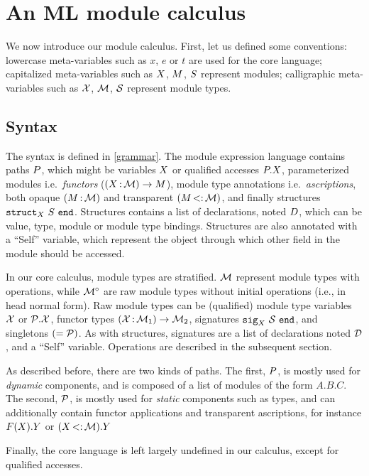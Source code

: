 \section{An ML module calculus}

We now introduce our module calculus.
First, let us defined some conventions:
lowercase meta-variables such as $x$, $e$ or $t$ are used for the core language;
capitalized meta-variables such as $X$, $M$, $S$ represent modules;
calligraphic meta-variables such as $\mathcal X$, $\mathcal M$, $\mathcal S$ represent module types.

\subsection{Syntax}

The syntax is defined in \cref{grammar}.
The module expression language contains paths $P$, which might
be variables $X$ or qualified accesses $P.X$,
parameterized modules i.e.~\emph{functors} ($(X \operatorname{:} \mathcal M) \to M$),
module type annotations i.e.~\emph{ascriptions}, both
opaque $(M \operatorname{:} \mathcal M)$ and transparent $(M \operatorname{<:} \mathcal M)$,
and finally structures $\mathtt{struct}_{X}\ S\ \mathtt{end}$. Structures
contains a list of declarations, noted $D$, which can be value, type, module or module type bindings. Structures are also annotated with a ``Self'' variable,
which represent the object through which
other field in the module should be accessed.

In our core calculus, module types are stratified. $\mathcal M$ represent module
types with operations, while ${\mathcal M^\circ}$ are raw module types without initial operations
(i.e., in head normal form). Raw module types can be (qualified)
module type variables $\mathcal X$ or $\mathcal P.\mathcal X$, functor types
$(\mathcal X \operatorname{:} \mathcal M_1) \to \mathcal M_2$, signatures $\mathtt{sig}_{X}\ \mathcal S\ \mathtt{end}$,
and singletons $(= \mathcal P)$.
As with structures, signatures are a list of declarations noted $\mathcal D$, and
a ``Self'' variable. Operations are described in the subsequent section.

As described before, there are two kinds of paths.
The first, $P$, is
mostly used for \emph{dynamic} components, and is composed of a list of
modules of the form $A.B.C$.
The second, $\mathcal P$, is mostly used for \emph{static} components such as types,
and can additionally contain functor applications and transparent ascriptions,
for instance $F(X).Y$ or $(X \operatorname{<:} \mathcal M).Y$

Finally, the core language is left largely undefined in our calculus, except for qualified accesses.

